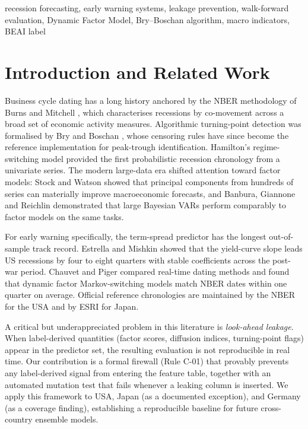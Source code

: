 \documentclass[conference]{IEEEtran}
\begin{document}
\begin{IEEEkeywords}
recession forecasting, early warning systems, leakage prevention, walk-forward evaluation,
Dynamic Factor Model, Bry--Boschan algorithm, macro indicators, BEAI label
\end{IEEEkeywords}

\section{Introduction and Related Work}

Business cycle dating has a long history anchored by the NBER methodology of
Burns and Mitchell \cite{BurnsMitchell1946}, which characterises recessions by
co-movement across a broad set of economic activity measures. Algorithmic
turning-point detection was formalised by Bry and Boschan \cite{BryBoschan1971},
whose censoring rules have since become the reference implementation for peak-trough
identification. Hamilton's regime-switching model \cite{Hamilton1989} provided the
first probabilistic recession chronology from a univariate series. The modern
large-data era shifted attention toward factor models: Stock and Watson
\cite{StockWatson2002,StockWatson2016} showed that principal components from
hundreds of series can materially improve macroeconomic forecasts, and
Banbura, Giannone and Reichlin \cite{BanburaGiannoneReichlin2010} demonstrated
that large Bayesian VARs perform comparably to factor models on the same tasks.

For early warning specifically, the term-spread predictor has the longest
out-of-sample track record. Estrella and Mishkin \cite{EstrellaMishkin1998} showed
that the yield-curve slope leads US recessions by four to eight quarters with stable
coefficients across the post-war period. Chauvet and Piger \cite{ChauvetPiger2008}
compared real-time dating methods and found that dynamic factor Markov-switching
models match NBER dates within one quarter on average. Official reference chronologies
are maintained by the NBER \cite{NBER_dates} for the USA and by ESRI \cite{ESRI_dates}
for Japan.

A critical but underappreciated problem in this literature is \emph{look-ahead leakage}.
When label-derived quantities (factor scores, diffusion indices, turning-point flags)
appear in the predictor set, the resulting evaluation is not reproducible in real
time. Our contribution is a formal firewall (Rule C-01) that provably prevents
any label-derived signal from entering the feature table, together with an
automated mutation test that fails whenever a leaking column is inserted.
We apply this framework to USA, Japan (as a documented exception), and Germany
(as a coverage finding), establishing a reproducible baseline for future cross-country
ensemble models.
\end{document}
